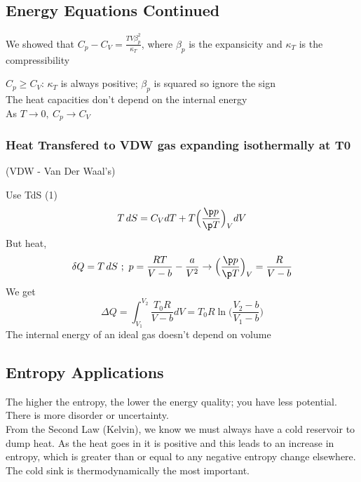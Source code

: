 \documentclass[a4paper, 11pt, normalem]{report}
\begin{document}
\chapter{}
\section{Energy Equations Continued}
We showed that $C_p - C_V = \frac{TV\beta_{p}^2}{\kappa_T}$, where $\beta_p$ is the expansicity and $\kappa_T$ is the compressibility

$C_p \geq C_V$: $\kappa_T$ is always positive; $\beta_p$ is squared so ignore the sign \\
The heat capacities don't depend on the internal energy \\
As $T \to 0,~ C_p \to C_V$

\subsection{Heat Transfered to VDW gas expanding isothermally at T0}
(VDW - Van Der Waal's)

Use TdS (1)
\begin{equation*}
    T\,dS = C_V dT + T\Big(\frac{\p p}{\p T}\Big)_V dV
\end{equation*}
But heat,
\begin{equation*}
    \delta Q = T\,dS ~;~ p = \frac{RT}{V - b} - \frac{a}{V^2} \to \Big(\frac{\p p}{\p T}\Big)_V = \frac{R}{V - b}
\end{equation*}
We get
\begin{equation*}
    \Delta Q = \int_{V_1}^{V_2} \frac{T_0 R}{V - b}dV = T_0 R\ln\Big(\frac{V_2 - b}{V_1 - b}\Big)
\end{equation*}
The internal energy of an ideal gas doesn't depend on volume

\section{Entropy Applications}
The higher the entropy, the lower the energy quality; you have less potential.
There is more disorder or uncertainty. \\
From the Second Law (Kelvin), we know we must always have a cold reservoir to dump heat.
As the heat goes in it is positive and this leads to an increase in entropy, which is greater than or equal to any negative entropy change elsewhere. \\
The cold sink is thermodynamically the most important.
\end{document}
